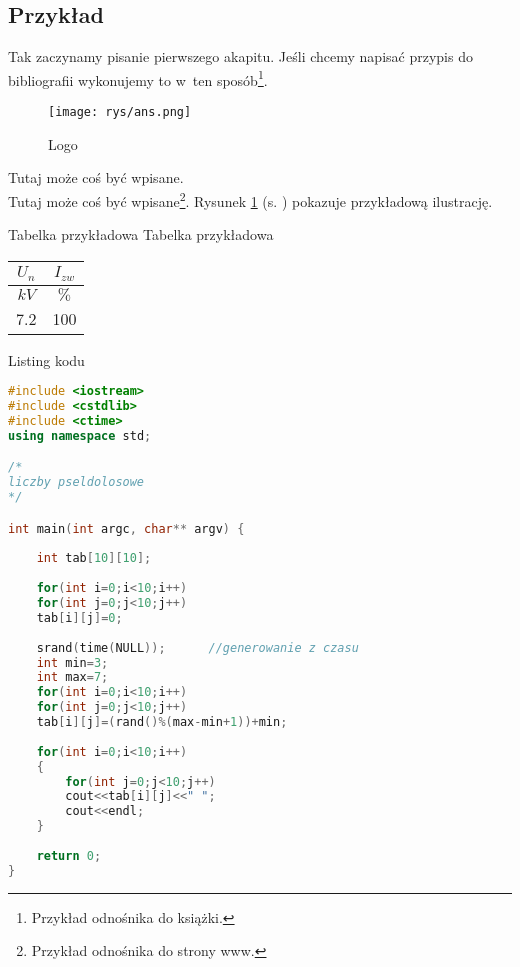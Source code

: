 \subsection{Przykład}  %

\hspace{0.60cm}Tak zaczynamy pisanie pierwszego akapitu. Jeśli chcemy napisać przypis do bibliografii wykonujemy to w~ten sposób\footnote{Przykład odnośnika do książki\cite{legierski}.}.

	\begin{figure}[!htb]
	\begin{center}
		\texttt{[image: rys/ans.png]}
		\caption{Logo}
		\label{rys:rysunek001}
	\end{center}
\end{figure}

Tutaj może coś być wpisane. \\Tutaj może coś być wpisane\footnote{Przykład odnośnika do strony www\cite{www1}.}. 
Rysunek \ref{rys:rysunek001} (s. \pageref{rys:rysunek001}) pokazuje przykładową ilustrację.

\begin{tabela}
	{Tabelka przykładowa}	%
	{Tabelka przykładowa}	%
	{
		\begin{tabular}{|c|c|} \hline
			$U_n$ & $I_{zw}$ \\ \hline
			$kV$  & $\%$      \\ \hline
			7.2 & 100 \\ \hline
		\end{tabular}
	}
	\label{tab:tablica001}
\end{tabela}


Listing kodu

\begin{lstlisting}[caption=Przykładowy kod 001, label={lst:listing-cpp}, language=C++]
#include <iostream>
#include <cstdlib>
#include <ctime>
using namespace std;

/*
liczby pseldolosowe
*/

int main(int argc, char** argv) {
	
	int tab[10][10];
	
	for(int i=0;i<10;i++)
	for(int j=0;j<10;j++)
	tab[i][j]=0;
	
	srand(time(NULL));		//generowanie z czasu
	int min=3;
	int max=7;
	for(int i=0;i<10;i++)
	for(int j=0;j<10;j++)		
	tab[i][j]=(rand()%(max-min+1))+min;	
	
	for(int i=0;i<10;i++)
	{
		for(int j=0;j<10;j++)
		cout<<tab[i][j]<<" ";	
		cout<<endl;
	}
	
	return 0;
}
\end{lstlisting}

